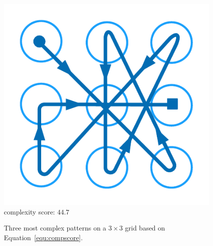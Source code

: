 \begin{figure}[!t]
{\begin{minipage}[b]{0.12\textwidth}
                \includegraphics[width=\textwidth]{fig/complex2.pdf} \\
                \centering  complexity score: $44.7$
                \end{minipage}
            }
            \caption{Three most complex patterns on a $3\times 3$ grid based on Equation~\ref{equ:compscore}.}
            \label{fig:most complex patterns}
        \end{figure}

